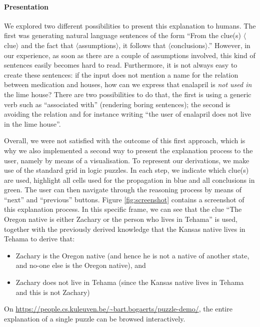 \paragraph{Presentation}
We explored two different possibilities to present this explanation to humans. 
The first was generating natural language sentences of the form 
``From the clue(s) $\langle$clue$\rangle$ and the fact that $\langle$assumptions$\rangle$, it follows that $\langle$conclusions$\rangle$.''
However, in our experience, as soon as there are a couple of assumptions involved, this kind of sentences easily becomes hard to read. Furthermore, it is not always easy to create these sentences: if the input does not mention a name for the relation between medication and houses, how can we express that enalapril is \emph{not used in} the lime house? 
There are two possibilities to do that, the first is using a generic verb such as ``associated with'' (rendering boring sentences); the second is avoiding the relation and for instance writing ``the user of enalapril does not live in the lime house''. 

Overall, we were not satisfied with the outcome of this first approach, which is why we also implemented a second way to present the explanation process to the user, namely by means of a visualisation. To represent our derivations, we make use of the standard grid in logic puzzles. In each step, we indicate which clue(s) are used, highlight all cells used for the propagation in blue and all conclusions in green. 
The user can then navigate through the reasoning process by means of ``next'' and ``previous'' buttons. 
Figure \ref{fig:screenshot} contains a screenshot of this explanation process. 
In this specific frame, we can see that the clue ``The Oregon native is either Zachary or the person who lives in Tehama'' is used, together with the previously derived knowledge that the Kansas native lives in Tehama to derive that:
\begin{itemize}
 \item Zachary is the Oregon native (and hence he is not a native of another state, and no-one else is the Oregon native), and
 \item Zachary does not live in Tehama (since the Kansas native lives in Tehama and this is not Zachary)
\end{itemize}
On \url{https://people.cs.kuleuven.be/~bart.bogaerts/puzzle-demo/}, the entire explanation of a single puzzle can be browsed interactively. 

